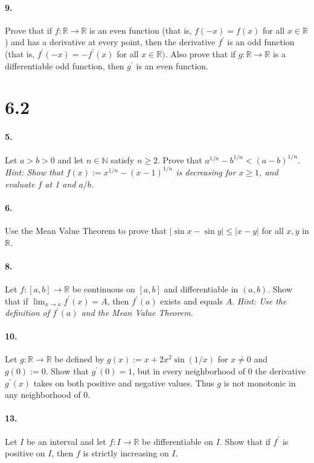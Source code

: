 \documentclass[12pt]{article}
\theoremstyle{remark}
\begin{document}
\paragraph{9.} Prove that if $f: \mathbb{R} \rightarrow \mathbb{R}$ is an even function (that is, $f(-x)=f(x)$ for all $x \in \mathbb{R}$) and has a derivative at every point, then the derivative $f^{\prime}$ is an odd function (that is, $f^{\prime}(-x)=-f^{\prime}(x)$ for all $x \in \mathbb{R})$. Also prove that if $g: \mathbb{R} \rightarrow \mathbb{R}$ is a differentiable odd function, then $g^{\prime}$ is an even function.

\section*{6.2}
\paragraph{5.} Let $a>b>0$ and let $n \in \mathbb{N}$ satisfy $n \geq 2$. Prove that $a^{1 / n}-b^{1 / n}<(a-b)^{1 / n}$. \emph{Hint: Show that $f(x):=x^{1 / n}-(x-1)^{1 / n}$ is decreasing for $x \geq 1$, and evaluate $f$ at 1 and $a / b$.}

\paragraph{6.} Use the Mean Value Theorem to prove that $|\sin x-\sin y| \leq|x-y|$ for all $x, y$ in $\mathbb{R}$.

\paragraph{8.} Let $f:[a, b] \rightarrow \mathbb{R}$ be continuous on $[a, b]$ and differentiable in $(a, b)$. Show that if $\lim _{x \rightarrow a} f^{\prime}(x)=A$, then $f^{\prime}(a)$ exists and equals $A$. \emph{Hint: Use the definition of $f^{\prime}(a)$ and the Mean Value Theorem.}

\paragraph{10.} Let $g: \mathbb{R} \rightarrow \mathbb{R}$ be defined by $g(x):=x+2 x^2 \sin (1 / x)$ for $x \neq 0$ and $g(0):=0$. Show that $g^{\prime}(0)=1$, but in every neighborhood of 0 the derivative $g^{\prime}(x)$ takes on both positive and negative values. Thus $g$ is not monotonic in any neighborhood of 0.

\paragraph{13.} Let $I$ be an interval and let $f: I \rightarrow \mathbb{R}$ be differentiable on $I$. Show that if $f^{\prime}$ is positive on $I$, then $f$ is strictly increasing on $I$.
\end{document}
